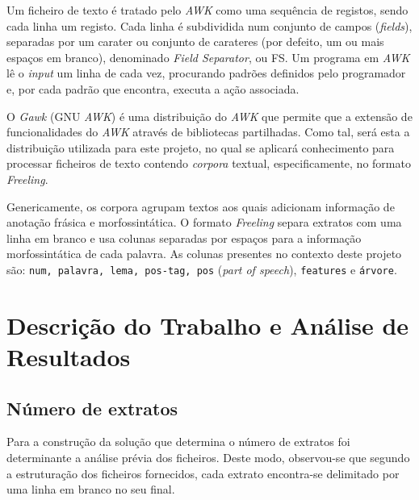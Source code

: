 \documentclass[a4paper]{article}
\begin{document}
\par Um ficheiro de texto é tratado pelo \textit{AWK} como uma sequência de registos, sendo cada linha um registo. Cada linha é subdividida num conjunto de campos (\textit{fields}), separadas por um carater ou conjunto de carateres (por defeito, um ou mais espaços em branco), denominado \textit{Field Separator}, ou FS. Um programa em \textit{AWK} lê o \textit{input} um linha de cada vez, procurando padrões definidos pelo programador e, por cada padrão que encontra, executa a ação associada.\cite{Aho}

\par O \textit{Gawk} (GNU \textit{AWK}) é uma distribuição do \textit{AWK} que permite que a extensão de funcionalidades do \textit{AWK} através de bibliotecas partilhadas. Como tal, será esta a distribuição utilizada para este projeto, no qual se aplicará conhecimento para processar ficheiros de texto contendo \textit{corpora} textual, especificamente, no formato \textit{Freeling}.

\par Genericamente, os corpora agrupam textos aos quais adicionam informação de anotação frásica e morfossintática. O formato \textit{Freeling} separa extratos com uma linha em branco e usa colunas separadas por espaços para a informação morfossintática de cada palavra. As colunas presentes no contexto deste projeto são: \texttt{num, palavra, lema, pos-tag, pos} (\textit{part of speech}), \texttt{features} e \texttt{árvore}.


\pagebreak
\section{Descrição do Trabalho e Análise de Resultados}
\label{sec:2}

\subsection{Número de extratos}

\hspace{3mm} Para a construção da solução que determina o número de extratos foi determinante a análise prévia dos ficheiros. Deste modo, observou-se que segundo a estruturação dos ficheiros fornecidos, cada extrato encontra-se delimitado por uma linha em branco no seu final.
\end{document}

